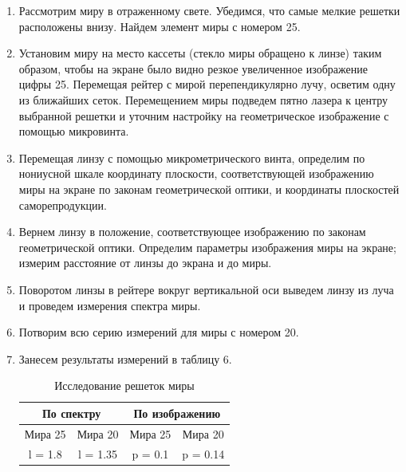 \documentclass[a4paper, 12pt]{article}
\begin{document}
	 \begin{enumerate}
	 	\item Рассмотрим миру в отраженному свете. Убедимся, что самые мелкие решетки расположены внизу. Найдем элемент миры с номером 25.
	 	\item Установим миру на место кассеты (стекло миры обращено к линзе) таким образом, чтобы на экране было видно резкое увеличенное изображение цифры 25. Перемещая рейтер с мирой перепендикулярно лучу, осветим одну из ближайших сеток. Перемещением миры подведем пятно лазера к центру выбранной решетки и уточним настройку на геометрическое изображение с помощью микровинта.
	 	\item Перемещая линзу с помощью микрометрического винта, определим по нониусной шкале координату плоскости, соответствующей изображению миры на экране по законам геометрической оптики, и координаты плоскостей саморепродукции.
	 	\item Вернем линзу в положение, соответствующее изображению по законам геометрической оптики. Определим параметры изображения миры на экране; измерим расстояние от линзы до экрана и до миры.
	 	\item Поворотом линзы в рейтере вокруг вертикальной оси выведем линзу из луча и проведем измерения спектра миры.
	 	\item Потворим всю серию измерений для миры с номером 20.
	 	\item Занесем результаты измерений в таблицу 6.
	 	\begin{table}[h]
	 		\centering
	 		\begin{tabular}{|c|c|c|c|}
			\hline
			\multicolumn{2}{|c|}{По спектру} & \multicolumn{2}{c|}{По изображению} \\ \hline
			Мира 25        & Мира 20         & Мира 25          & Мира 20          \\ \hline
			l = 1.8        & l = 1.35        & p = 0.1          & p = 0.14         \\ \hline
			\end{tabular}
			\caption{Исследование решеток миры}
	 	\end{table}
	 	

\end{enumerate}
\end{document}
